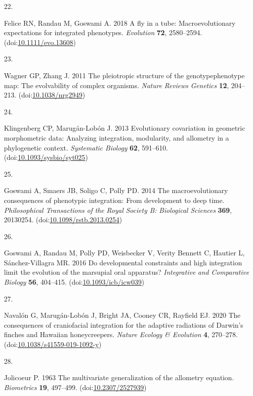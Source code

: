 \documentclass[
  11pt,
]{article}
\newlength{\cslhangindent}
\newlength{\csllabelwidth}
\newlength{\cslentryspacingunit} %
\newenvironment{CSLReferences}[2] %
 {%
  \setlength{\parindent}{0pt}
  \ifodd #1
  \let\oldpar\par
  \def\par{\hangindent=\cslhangindent\oldpar}
  \fi
  \setlength{\parskip}{#2\cslentryspacingunit}
 }%
 {}
\newcommand{\CSLLeftMargin}[1]{\parbox[t]{\csllabelwidth}{#1}}
\newcommand{\CSLRightInline}[1]{\parbox[t]{\linewidth - \csllabelwidth}{#1}\break}
\begin{document}
\begin{CSLReferences}{0}{0}
\leavevmode{}%
\CSLLeftMargin{22. }%
\CSLRightInline{Felice RN, Randau M, Goswami A. 2018 A fly in a tube:
Macroevolutionary expectations for integrated phenotypes.
\emph{Evolution} \textbf{72}, 2580--2594.
(doi:\href{https://doi.org/10.1111/evo.13608}{10.1111/evo.13608})}

\leavevmode{}%
\CSLLeftMargin{23. }%
\CSLRightInline{Wagner GP, Zhang J. 2011 The pleiotropic structure of
the genotype{\textendash}phenotype map: The evolvability of complex
organisms. \emph{Nature Reviews Genetics} \textbf{12}, 204--213.
(doi:\href{https://doi.org/10.1038/nrg2949}{10.1038/nrg2949})}

\leavevmode{}%
\CSLLeftMargin{24. }%
\CSLRightInline{Klingenberg CP, Marugán-Lobón J. 2013 Evolutionary
covariation in geometric morphometric data: Analyzing integration,
modularity, and allometry in a phylogenetic context. \emph{Systematic
Biology} \textbf{62}, 591--610.
(doi:\href{https://doi.org/10.1093/sysbio/syt025}{10.1093/sysbio/syt025})}

\leavevmode{}%
\CSLLeftMargin{25. }%
\CSLRightInline{Goswami A, Smaers JB, Soligo C, Polly PD. 2014 The
macroevolutionary consequences of phenotypic integration: From
development to deep time. \emph{Philosophical Transactions of the Royal
Society B: Biological Sciences} \textbf{369}, 20130254.
(doi:\href{https://doi.org/10.1098/rstb.2013.0254}{10.1098/rstb.2013.0254})}

\leavevmode{}%
\CSLLeftMargin{26. }%
\CSLRightInline{Goswami A, Randau M, Polly PD, Weisbecker V, Verity
Bennett C, Hautier L, Sánchez-Villagra MR. 2016 Do developmental
constraints and high integration limit the evolution of the marsupial
oral apparatus? \emph{Integrative and Comparative Biology} \textbf{56},
404--415.
(doi:\href{https://doi.org/10.1093/icb/icw039}{10.1093/icb/icw039})}

\leavevmode{}%
\CSLLeftMargin{27. }%
\CSLRightInline{Navalón G, Marugán-Lobón J, Bright JA, Cooney CR,
Rayfield EJ. 2020 The consequences of craniofacial integration for the
adaptive radiations of {D}arwin's finches and {H}awaiian honeycreepers.
\emph{Nature Ecology \& Evolution} \textbf{4}, 270--278.
(doi:\href{https://doi.org/10.1038/s41559-019-1092-y}{10.1038/s41559-019-1092-y})}

\leavevmode{}%
\CSLLeftMargin{28. }%
\CSLRightInline{Jolicoeur P. 1963 The multivariate generalization of the
allometry equation. \emph{Biometrics} \textbf{19}, 497--499.
(doi:\href{https://doi.org/10.2307/2527939}{10.2307/2527939})}


\end{CSLReferences}
\end{document}

